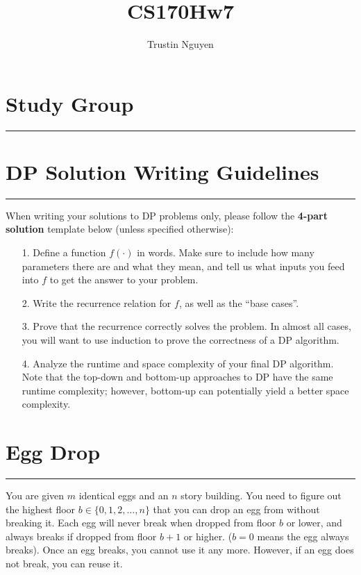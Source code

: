 \documentclass{article}
\title{CS170Hw7}
\author{Trustin Nguyen}
\begin{document}
    \maketitle

\reversemarginpar

\section*{Study Group}
\hrule

\section*{DP Solution Writing Guidelines}
\hrule

When writing your solutions to DP problems only, please follow the \textbf{4-part solution} template below (unless specified otherwise):
    \begin{itemize}
        \item [1.] Define a function $f(\cdot)$ in words. Make sure to include how many parameters there are and what they mean, and tell us what inputs you feed into $f$ to get the answer to your problem.

        \item [2.] Write the recurrence relation for $f$, as well as the ``base cases''.

        \item [3.] Prove that the recurrence correctly solves the problem. In almost all cases, you will want to use induction to prove the correctness of a DP algorithm.

        \item [4.] Analyze the runtime and space complexity of your final DP algorithm. Note that the top-down and bottom-up approaches to DP have the same runtime complexity; however, bottom-up can potentially yield a better space complexity.
    \end{itemize}

\newpage
\section*{Egg Drop}
\hrule

You are given $m$ identical eggs and an $n$ story building. You need to figure out the highest floor $b \in \{0, 1, 2, \ldots, n\}$ that you can drop an egg from without breaking it. Each egg will never break when dropped from floor $b$ or lower, and always breaks if dropped from floor $b + 1$ or higher. ($b = 0$ means the egg always breaks). Once an egg breaks, you cannot use it any more. However, if an egg does not break, you can reuse it.
\end{document}
